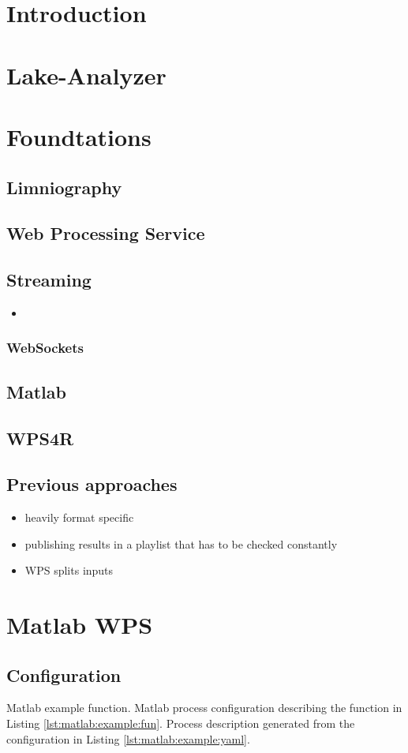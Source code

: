 \section{Introduction}
\section{Lake-Analyzer}
\section{Foundtations}
	\subsection{Limniography}
	\subsection{Web Processing Service}
	\subsection{Streaming}
		\begin{itemize}
			\item
		\end{itemize}
		\subsubsection{WebSockets}
	\subsection{Matlab}
	\subsection{WPS4R}
	\subsection{Previous approaches}
	\begin{itemize}
		\item heavily format specific
		\item publishing results in a playlist that has to be checked constantly
		\item WPS splits inputs
	\end{itemize}
\section{Matlab WPS}
	\subsection{Configuration}
		{\label{lst:matlab:example:fun}Matlab example function.}
		{\label{lst:matlab:example:yaml}Matlab process configuration describing the function in Listing \ref{lst:matlab:example:fun}.}
		{\label{lst:matlab:example:desc}Process description generated from the configuration in Listing \ref{lst:matlab:example:yaml}.}

